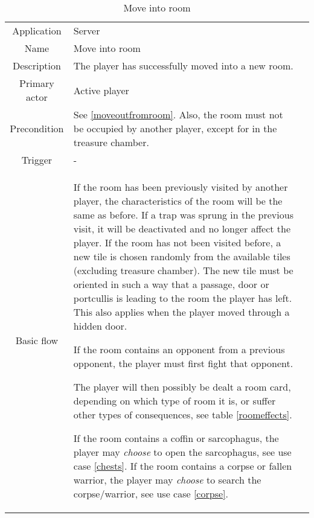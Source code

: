 \documentclass[a4paper,10pt]{report}
\begin{document}
\begin{table}
\caption{Move into room}
\label{moveintoroom}
\begin{tabular}{|c| p{9cm}|c}
\hline
Application & Server & \\
Name & Move into room & \\
Description & The player has successfully moved into a new room. & \\
Primary actor & Active player & \\
Precondition & See \ref{moveoutfromroom}. Also, the room must not be occupied by another player, except for in the treasure chamber. & \\
Trigger & - & \\ \hline
Basic flow & If the room has been previously visited by another player, the characteristics of the room will be the same as before. If a trap was sprung in the previous visit, it will be deactivated and no longer affect the player. If the room has not been visited before, a new tile is chosen randomly from the available tiles (excluding treasure chamber). The new tile must be oriented in such a way that a passage, door or portcullis is leading to the room the player has left. This also applies when the player moved through a hidden door.

If the room contains an opponent from a previous opponent, the player must first fight that opponent.

The player will then possibly be dealt a room card, depending on which type of room it is, or suffer other types of consequences, see table \ref{roomeffects}.

If the room contains a coffin or sarcophagus, the player may \emph{choose} to open the sarcophagus, see use case \ref{chests}. If the room contains a corpse or fallen warrior, the player may \emph{choose} to search the corpse/warrior, see use case \ref{corpse}.

& \\ \hline
\end{tabular}
\end{table}
\end{document}
